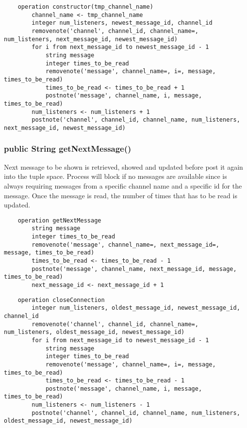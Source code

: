 \documentclass[10pt,a4paper]{article}
\begin{document}
\begin{verbatim}	
	operation constructor(tmp_channel_name)
		channel_name <- tmp_channel_name
		integer num_listeners, newest_message_id, channel_id
		removenote('channel', channel_id, channel_name=, num_listeners, next_message_id, newest_message_id)
		for i from next_message_id to newest_message_id - 1
			string message
			integer times_to_be_read
			removenote('message', channel_name=, i=, message, times_to_be_read)
			times_to_be_read <- times_to_be_read + 1
			postnote('message', channel_name, i, message, times_to_be_read)
		num_listeners <- num_listeners + 1
		postnote('channel', channel_id, channel_name, num_listeners, next_message_id, newest_message_id)
\end{verbatim}

\subsubsection{public String getNextMessage()}

Next message to be shown is retrieved, showed and updated before post it again into the tuple space. Process will block if no messages are available since is always requiring messages from a specific channel name and a specific id for the message.
Once the message is read, the number of times that has to be read is updated.

\begin{verbatim}
	operation getNextMessage
		string message
		integer times_to_be_read
		removenote('message', channel_name=, next_message_id=, message, times_to_be_read)
		times_to_be_read <- times_to_be_read - 1
		postnote('message', channel_name, next_message_id, message, times_to_be_read)
		next_message_id <- next_message_id + 1
\end{verbatim}

\begin{verbatim}
	operation closeConnection
		integer num_listeners, oldest_message_id, newest_message_id, channel_id
		removenote('channel', channel_id, channel_name=, num_listeners, oldest_message_id, newest_message_id)
		for i from next_message_id to newest_message_id - 1
			string message
			integer times_to_be_read
			removenote('message', channel_name=, i=, message, times_to_be_read)
			times_to_be_read <- times_to_be_read - 1
			postnote('message', channel_name, i, message, times_to_be_read)
		num_listeners <- num_listeners - 1
		postnote('channel', channel_id, channel_name, num_listeners, oldest_message_id, newest_message_id)
\end{verbatim}
\end{document}

